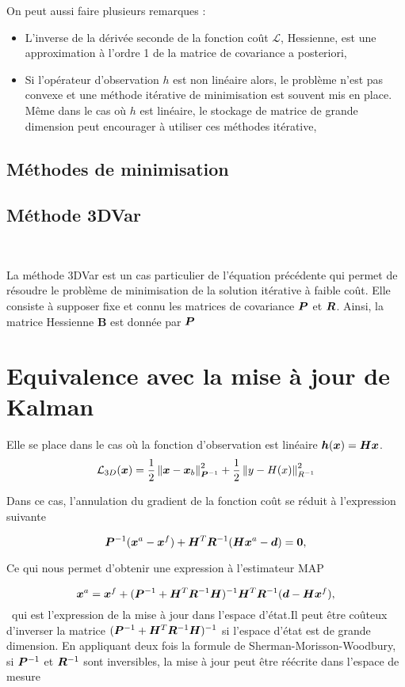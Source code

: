 On peut aussi faire plusieurs remarques :

\begin{itemize}
    \item L'inverse de la dérivée seconde de la fonction coût $\mathcal L$, Hessienne, est une approximation à l'ordre 1 de la matrice de covariance a posteriori,
    \item Si l'opérateur d'observation $h$ est non linéaire alors, le problème n'est pas convexe et une méthode itérative de minimisation est souvent mis en place. Même dans le cas où $h$ est linéaire, le stockage de matrice de grande dimension peut encourager à utiliser ces méthodes itérative,
\end{itemize}

\subsection{Méthodes de minimisation}

\subsection{Méthode 3DVar}~\label{subsec:3dvar}

La méthode 3DVar est un cas particulier de l'équation précédente qui permet de résoudre le problème de minimisation de la solution itérative à faible coût. Elle consiste à supposer fixe et connu les matrices de covariance $\bm{P}$ et $\bm{R}$. Ainsi, la matrice Hessienne $\bm B$ est donnée par $\bm{P}$

\section{Equivalence avec la mise à jour de Kalman}

Elle se place dans le cas où la fonction d'observation est linéaire $\bm h(\bm{x}) = \bm{H} \bm{x}$.
$$\mathcal L_{3D}(\bm{x}) = \frac{1}{2}\left\lVert \bm{x}-\bm{x}_b \right\rVert_{\bm{P}^{-1}}^2+ \frac{1}{2}\left\lVert y-H(x) \right\rVert^2_{R^{-1}}$$

Dans ce cas, l'annulation du gradient de la fonction coût se réduit à l'expression suivante

\begin{equation*}
    \bm{P}^{-1} (\bm{x}^a - \bm{x}^f) + \bm{H}^T \bm{R}^{-1}(\bm{H} \bm{x}^a - \bm d) = \bm 0,
\end{equation*}

Ce qui nous permet d'obtenir une expression à l'estimateur MAP

\begin{equation*}
    \bm{x}^a = \bm{x}^f + (\bm{P}^{-1} + \bm{H}^T \bm{R}^{-1} \bm{H})^{-1} \bm{H}^T \bm{R}^{-1} (\bm{d} - \bm{H} \bm{x}^f),
\end{equation*}~qui est l'expression de la mise à jour dans l'espace d'état.Il peut être coûteux d'inverser la matrice $(\bm{P}^{-1} + \bm{H}^T \bm{R}^{-1} \bm{H})^{-1}$ si l'espace d'état est de grande dimension. En appliquant deux fois la formule de Sherman-Morisson-Woodbury, si $\bm{P}^{-1}$ et $\bm{R}^{-1}$ sont inversibles, la mise à jour peut être réécrite dans l'espace de mesure


